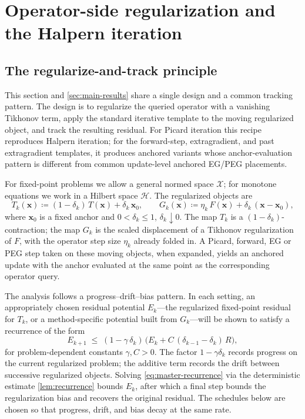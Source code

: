 \documentclass[letterpaper,11pt]{article}
\newcommand{\vect}[1]{\mathbf{#1}}
\begin{document}
\section{Operator-side regularization and the Halpern iteration}
\label{sec:operator-side-regularization}

\subsection{The regularize-and-track principle}
\label{sec:framework_principle}

This section and \cref{sec:main-results} share a single design and a common
tracking pattern. The design is to regularize the queried operator with a
vanishing Tikhonov term, apply the standard iterative template to the moving
regularized object, and track the resulting residual. For Picard iteration this
recipe reproduces Halpern iteration; for the forward-step, extragradient,
and past extragradient templates, it produces anchored variants
whose anchor-evaluation pattern is different from common update-level anchored
EG/PEG placements.

For fixed-point problems we allow a general normed space \(\mathcal X\); for
monotone equations we work in a Hilbert space \(\mathcal H\). The regularized
objects are
\begin{equation}\label{eq:reg-objects}
    T_k(\vect{x}) \coloneqq (1 - \delta_k)\,T(\vect{x}) + \delta_k\,\vect{x}_0,
    \qquad
    G_k(\vect{x}) \coloneqq \eta_k\,F(\vect{x}) + \delta_k\,(\vect{x} - \vect{x}_0),
\end{equation}
where \(\vect{x}_0\) is a fixed anchor and \(0<\delta_k\le1\),
\(\delta_k\downarrow0\). The map \(T_k\) is a
\((1-\delta_k)\)-contraction; the map \(G_k\) is the scaled displacement of a
Tikhonov regularization of \(F\), with the operator step size \(\eta_k\) already
folded in. A Picard, forward, EG or PEG step taken on these moving
objects, when expanded, yields an anchored update with the anchor evaluated at
the same point as the corresponding operator query.

The analysis follows a progress--drift--bias pattern. In each setting, an
appropriately chosen residual potential \(E_k\)---the regularized fixed-point
residual for \(T_k\), or a method-specific potential built from \(G_k\)---will
be shown to satisfy a recurrence of the form
\begin{equation}\label{eq:master-recurrence}
    E_{k+1}
    \;\le\;
    (1 - \gamma\,\delta_k)\,\bigl(E_k + C\,(\delta_{k-1} - \delta_k)\,R\bigr),
\end{equation}
for problem-dependent constants \(\gamma,C>0\). The factor
\(1-\gamma\delta_k\) records progress on the current regularized problem; the
additive term records the drift between successive regularized objects. Solving
\eqref{eq:master-recurrence} via the deterministic estimate
\cref{lem:recurrence} bounds \(E_k\), after which a final step bounds the
regularization bias and recovers the original residual. The schedules below are
chosen so that progress, drift, and bias decay at the same rate.
\end{document}
